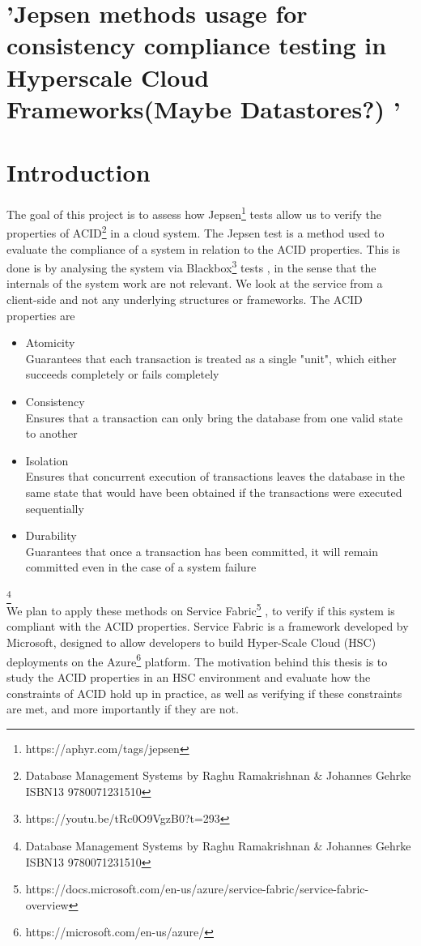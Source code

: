 \section{'Jepsen methods usage for consistency compliance testing in Hyperscale Cloud Frameworks(Maybe Datastores?) '}

\section{Introduction}
The goal of this project is to assess how Jepsen\footnote[1]{https://aphyr.com/tags/jepsen } tests allow us to verify the properties of ACID\footnote[2]{Database Management Systems by Raghu Ramakrishnan \& Johannes Gehrke  ISBN13 9780071231510} in a cloud system.
The Jepsen test is a method used to evaluate the compliance of a system in relation to the ACID properties. This is done is by analysing the system via Blackbox\footnote[3]{https://youtu.be/tRc0O9VgzB0?t=293} tests , in the sense that the internals of the system work are not relevant. We look at the service from a client-side and not any underlying structures or frameworks.
The ACID properties are 
\begin{itemize}
\item	Atomicity \\
Guarantees that each transaction is treated as a single "unit", which either succeeds completely or fails completely 
\item	Consistency \\
Ensures that a transaction can only bring the database from one valid state to another
\item	Isolation \\
Ensures that concurrent execution of transactions leaves the database in the same state that would have been obtained if the transactions were executed sequentially 
\item	Durability \\
Guarantees that once a transaction has been committed, it will remain committed even in the case of a system failure 
\end{itemize}
\footnote[2]{Database Management Systems by Raghu Ramakrishnan \& Johannes Gehrke  ISBN13 9780071231510} \\
We plan to apply these methods on Service Fabric\footnote[4]{https://docs.microsoft.com/en-us/azure/service-fabric/service-fabric-overview  } , to verify if this system is compliant with the ACID properties. Service Fabric is a framework developed by Microsoft, designed to allow developers to build Hyper-Scale Cloud (HSC) deployments on the Azure\footnote[5]{https://microsoft.com/en-us/azure/ } platform.
The motivation behind this thesis is to study the ACID properties in an HSC environment and evaluate how the constraints of ACID hold up in practice, as well as verifying if these constraints are met, and more importantly if they are not. 
